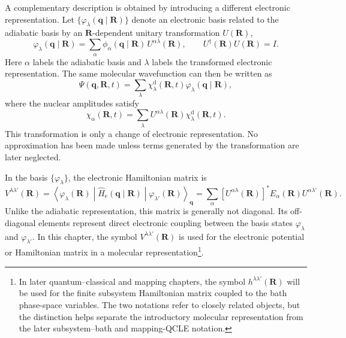 \documentclass[
  11pt,
  letterpaper,
  onehalfspacing,
  normalmargins,
  equalmargins,
  oneside
]{ut-thesis}
\begin{document}
A complementary description is obtained by introducing a different electronic
representation. Let
\(\{\varphi_\lambda(\mathbf q\mid\mathbf R)\}\) denote an electronic basis
related to the adiabatic basis by an \(\mathbf R\)-dependent unitary
transformation \(U(\mathbf R)\),
\begin{equation}
\varphi_\lambda(\mathbf q\mid\mathbf R)
=
\sum_\alpha
\phi_\alpha(\mathbf q\mid\mathbf R)\,
U^{\alpha\lambda}(\mathbf R),
\qquad
U^\dagger(\mathbf R)U(\mathbf R)=I .
\label{eq:adiabatic-to-general-electronic-basis}
\end{equation}
Here \(\alpha\) labels the adiabatic basis and \(\lambda\) labels the
transformed electronic representation. The same molecular wavefunction can
then be written as
\begin{equation}
\Psi(\mathbf q,\mathbf R,t)
=
\sum_\lambda
\chi_\lambda^{\mathrm d}(\mathbf R,t)
\varphi_\lambda(\mathbf q\mid\mathbf R),
\label{eq:general-electronic-basis-expansion}
\end{equation}
where the nuclear amplitudes satisfy
\begin{equation}
\chi_\alpha(\mathbf R,t)
=
\sum_\lambda
U^{\alpha\lambda}(\mathbf R)\chi_\lambda^{\mathrm d}(\mathbf R,t).
\label{eq:amplitude-transformation}
\end{equation}
This transformation is only a change of electronic representation. No
approximation has been made unless terms generated by the transformation are
later neglected.

In the basis \(\{\varphi_\lambda\}\), the electronic Hamiltonian matrix is
\begin{equation}
V^{\lambda\lambda'}(\mathbf R)
=
\left\langle
\varphi_\lambda(\mathbf R)
\middle|
\hat H_{\mathrm e}(\mathbf q\mid\mathbf R)
\middle|
\varphi_{\lambda'}(\mathbf R)
\right\rangle_{\mathbf q}
=
\sum_\alpha
\left[U^{\alpha\lambda}(\mathbf R)\right]^\ast
E_\alpha(\mathbf R)
U^{\alpha\lambda'}(\mathbf R).
\label{eq:general-electronic-hamiltonian-matrix}
\end{equation}
Unlike the adiabatic representation, this matrix is generally not diagonal.
Its off-diagonal elements represent direct electronic coupling between the
basis states \(\varphi_\lambda\) and \(\varphi_{\lambda'}\). In this chapter,
the symbol \(V^{\lambda\lambda'}(\mathbf R)\) is used for the electronic
potential or Hamiltonian matrix in a molecular representation\footnote{In later
quantum--classical and mapping chapters, the symbol
\(h^{\lambda\lambda'}(\mathbf R)\) will be used for the finite subsystem
Hamiltonian matrix coupled to the bath phase-space variables. The two notations
refer to closely related objects, but the distinction helps separate the
introductory molecular representation from the later subsystem--bath and
mapping-QCLE notation.}.
\end{document}
